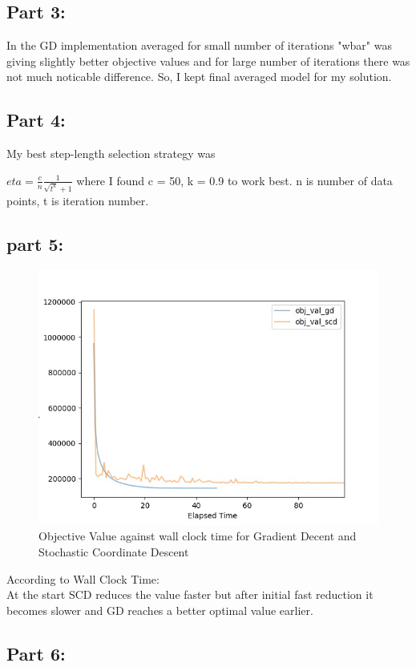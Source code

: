 \documentclass[a4paper,11pt]{article}
\begin{document}
\begin{mlsolution}

\subsection*{Part 3:}
In the GD implementation averaged for small number of iterations "wbar" was giving slightly better objective values and for large number of iterations there was not much noticable difference. So, I kept final averaged model for my solution.

\subsection*{Part 4:}

My best step-length selection strategy was 

$eta = \frac{c}{n}\frac{1}{\sqrt{t^k} + 1}$ where I found c = 50, k = 0.9 to work best. n is number of data points, t is iteration number.
 
\subsection*{part 5:}

\begin{figure}[th]%
\centering

\includegraphics[width=0.6\columnwidth]{q4/plot.jpeg}%

\caption{Objective Value against wall clock time for Gradient Decent and Stochastic Coordinate Descent }
  
\label{fig:proto}%
\end{figure}
According to Wall Clock Time: \\
At the start SCD reduces the value faster but after initial fast reduction it becomes slower and GD reaches a better optimal value earlier.  
\newpage 
\subsection*{Part 6:} 
 

\end{mlsolution}
\end{document}
